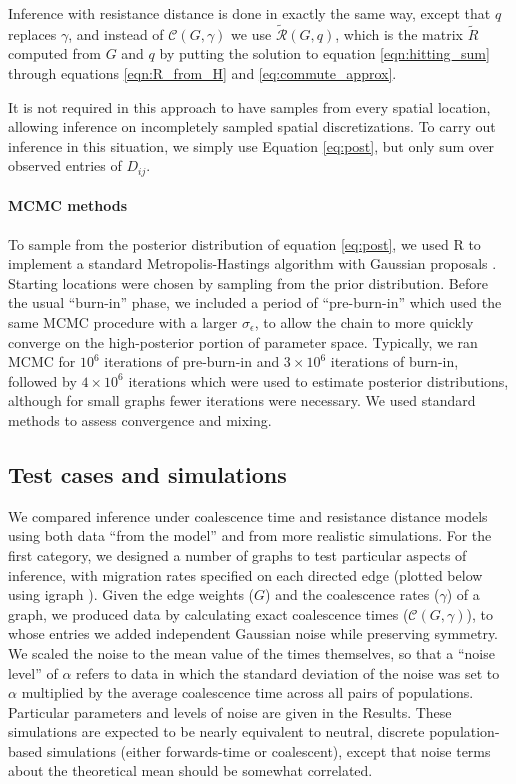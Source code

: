 \documentclass{article}
\newcommand{\comdist}{\widetilde{R}}
\newcommand{\comdistfn}{\widetilde{\mathcal{R}}}
\begin{document}
Inference with resistance distance is done in exactly the same way,
except that $q$ replaces $\gamma$,
and instead of $\mathcal{C}(G,\gamma)$ we use $\comdistfn(G, q)$,
which is the matrix $\comdist$ computed from $G$ and $q$ 
by putting the solution to equation \eqref{eqn:hitting_sum}
through equations \eqref{eqn:R_from_H} and \eqref{eq:commute_approx}.

It is not required in this approach to have samples from every spatial location,
allowing inference on incompletely sampled spatial discretizations.
To carry out inference in this situation,
we simply use Equation \ref{eq:post},
but only sum over observed entries of $D_{ij}$.

\paragraph{MCMC methods}
To sample from the posterior distribution of equation \eqref{eq:post}, 
we used R \citep{Rmanual} 
to implement a standard Metropolis-Hastings algorithm with Gaussian proposals \citep{brooks2011handbook}.
Starting locations were chosen by sampling from the prior distribution.
Before the usual ``burn-in'' phase,
we included a period of ``pre-burn-in'' which used the same MCMC procedure
with a larger $\sigma_\epsilon$, to allow the chain to more quickly converge on the high-posterior
portion of parameter space.
Typically, we ran MCMC for $10^6$ iterations of pre-burn-in 
and $3 \times 10^6$ iterations of burn-in,
followed by $4 \times 10^6$ iterations which were used to estimate posterior distributions,
although for small graphs fewer iterations were necessary.
We used standard methods to assess convergence and mixing.


\subsection*{Test cases and simulations}

We compared inference under coalescence time and resistance distance models
using both data ``from the model'' and from more realistic simulations.
For the first category, we designed a number of graphs to test particular aspects of inference,
with migration rates specified on each directed edge
(plotted below using igraph \citep{igraph}).
Given the edge weights ($G$) and the coalescence rates ($\gamma$) of a graph,
we produced data by calculating exact coalescence times ($\mathcal{C}(G,\gamma)$),
to whose entries we added independent Gaussian noise while preserving symmetry.
We scaled the noise to the mean value of the times themselves,
so that a ``noise level'' of $\alpha$ refers to data in which the standard deviation of the noise
was set to $\alpha$ multiplied by the average coalescence time across all pairs of populations.
Particular parameters and levels of noise are given in the Results.
These simulations are expected to be nearly equivalent to neutral, discrete population-based simulations
(either forwards-time or coalescent),
except that noise terms about the theoretical mean should be somewhat correlated.
\end{document}
